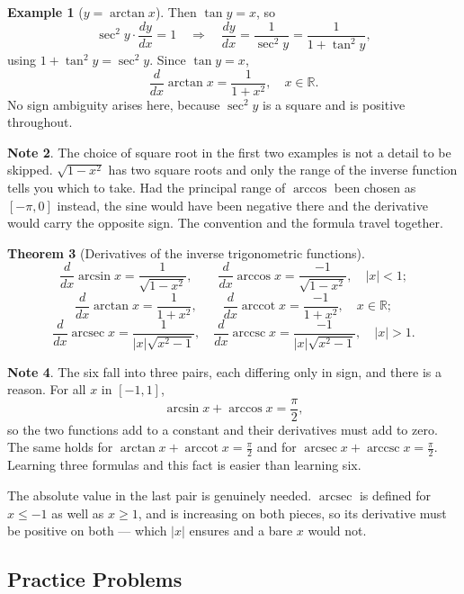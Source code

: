 \documentclass[11pt,a4paper]{article}
\theoremstyle{definition}
\newtheorem{thm}{Theorem}[section]
\newtheorem{example}[thm]{Example}
\newtheorem{note}[thm]{Note}
\begin{document}
\begin{example}[$y=\arctan x$]
Then $\tan y=x$, so
$$\sec^{2}y\cdot\frac{dy}{dx}=1
\quad \Longrightarrow\quad 
\frac{dy}{dx}=\frac{1}{\sec^{2}y}=\frac{1}{1+\tan^{2}y},$$
using $1+\tan^{2}y=\sec^{2}y$. Since $\tan y=x$,
$$\frac{d}{dx}\arctan x=\frac{1}{1+x^{2}},\quad x\in\mathbb{R}.$$
No sign ambiguity arises here, because $\sec^{2}y$ is a square and is positive
throughout.
\end{example}

\begin{note}
The choice of square root in the first two examples is not a detail to be skipped.
$\sqrt{1-x^{2}}$ has two square roots and only the range of the inverse function
tells you which to take. Had the principal range of $\arccos$ been chosen as
$[-\pi,0]$ instead, the sine would have been negative there and the derivative
would carry the opposite sign. The convention and the formula travel together.
\end{note}

\begin{thm}[Derivatives of the inverse trigonometric functions]
$$\frac{d}{dx}\arcsin x=\frac{1}{\sqrt{1-x^{2}}},
\qquad \frac{d}{dx}\arccos x=\frac{-1}{\sqrt{1-x^{2}}},
\quad \left|x\right|<1;$$
$$\frac{d}{dx}\arctan x=\frac{1}{1+x^{2}},
\qquad \frac{d}{dx}\operatorname{arccot} x=\frac{-1}{1+x^{2}},
\quad x\in\mathbb{R};$$
$$\frac{d}{dx}\operatorname{arcsec} x=\frac{1}{\left|x\right|\sqrt{x^{2}-1}},
\quad \frac{d}{dx}\operatorname{arccsc} x=\frac{-1}{\left|x\right|\sqrt{x^{2}-1}},
\quad \left|x\right|>1 .$$
\end{thm}

\begin{note}
The six fall into three pairs, each differing only in sign, and there is a reason.
For all $x$ in $[-1,1]$,
$$\arcsin x+\arccos x=\frac{\pi}{2},$$
so the two functions add to a constant and their derivatives must add to zero.
The same holds for $\arctan x+\operatorname{arccot} x=\frac{\pi}{2}$ and for
$\operatorname{arcsec} x+\operatorname{arccsc} x=\frac{\pi}{2}$. Learning three
formulas and this fact is easier than learning six.

The absolute value in the last pair is genuinely needed. $\operatorname{arcsec}$
is defined for $x\leq-1$ as well as $x\geq 1$, and is increasing on both pieces, so
its derivative must be positive on both --- which $\left|x\right|$ ensures and a
bare $x$ would not.
\end{note}

\subsection{Practice Problems}
\end{document}
